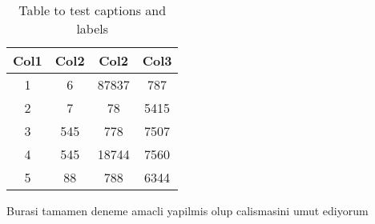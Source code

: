 \documentclass[12pt]{article}
\begin{document}
\begin{table}[h!]
\centering
\begin{tabular}{|c c c c|} 
 \hline
 Col1 & Col2 & Col2 & Col3 \\ [0.5ex] 
 \hline\hline
 1 & 6 & 87837 & 787 \\ 
 2 & 7 & 78 & 5415 \\
 3 & 545 & 778 & 7507 \\
 4 & 545 & 18744 & 7560 \\
 5 & 88 & 788 & 6344 \\ [1ex] 
 \hline
\end{tabular}
\caption{Table to test captions and labels}
\label{table:data}
\end{table}
\newpage

Burasi tamamen deneme amacli yapilmis olup calismasini umut ediyorum \pageref{table:data}


\medskip

\end{document}
